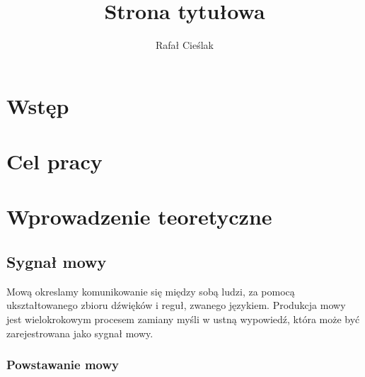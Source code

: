 \documentclass[a4paper,12 pt]{article}
\author{Rafał Cieślak}
\title{Strona tytułowa }
\date{ }
\begin{document}
\maketitle


\newpage
\tableofcontents
\listoffigures
\listoftables

\listofmycapequs

\newpage
\section{Wstęp}

\newpage
\section{Cel pracy}

\newpage
\section{Wprowadzenie teoretyczne}
\subsection{Sygnał mowy}
Mową okreslamy komunikowanie się między sobą ludzi, za pomocą ukształtowanego zbioru dźwięków i reguł, zwanego językiem.
Produkcja mowy jest wielokrokowym procesem zamiany myśli w ustną wypowiedź, która może być zarejestrowana jako sygnał mowy.
\subsubsection{Powstawanie mowy}
\end{document}
